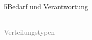 \documentclass[xcolor=table,9pt,aspectratio=169]{beamer}
\begin{document}
\begin{frame}{\vspace*{10mm}5\hspace*{1em}Bedarf und Verantwortung}
\begin{center}
   \\
   \footnotesize{\textcolor{gray}{Verteilungstypen}}
\end{center}
\end{frame}
\end{document}
